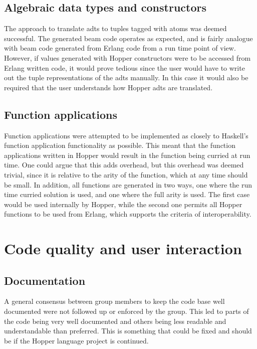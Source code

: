 \subsection{Algebraic data types and constructors}

The approach to translate \glspl{adt} to tuples tagged with atoms was deemed successful. The generated beam code operates as expected, and is fairly analogue with beam code generated from Erlang code from a run time point of view. However, if values generated with Hopper constructors were to be accessed from Erlang written code, it would prove tedious since the user would have to write out the tuple representations of the \glspl{adt} manually. In this case it would also be required that the user understands how Hopper \glspl{adt} are translated.

\subsection{Function applications}

Function applications were attempted to be implemented as closely to Haskell's function application functionality as possible. This meant that the function applications written in Hopper would result in the function being curried at run time. One could argue that this adds overhead, but this overhead was deemed trivial, since it is relative to the arity of the function, which at any time should be small. In addition, all functions are generated in two ways, one where the run time curried solution is used, and one where the full arity is used. The first case would be used internally by Hopper, while the second one permits all Hopper functions to be used from Erlang, which supports  the criteria of interoperability.

\section{Code quality and user interaction}

\subsection{Documentation}

A general consensus between group members to keep the code base well documented were not followed up or enforced by the group. This led to parts of the code being very well documented and others being less readable and understandable than preferred. This is something that could be fixed and should be if the Hopper language project is continued.

